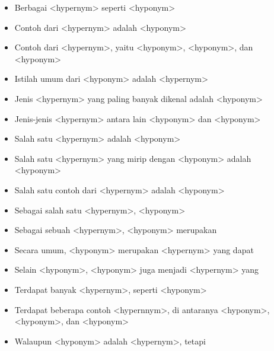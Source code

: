 \begin{itemize}
  \item Berbagai <hypernym> seperti <hyponym>
  \item Contoh dari <hypernym> adalah <hyponym>
  \item Contoh dari <hypernym>, yaitu <hyponym>, <hyponym>, dan <hyponym>
  \item Istilah umum dari <hyponym> adalah <hypernym>
  \item Jenis <hypernym> yang paling banyak dikenal adalah <hyponym>
  \item Jenis-jenis <hypernym> antara lain <hyponym> dan <hyponym>
  \item Salah satu <hypernym> adalah <hyponym>
  \item Salah satu <hypernym> yang mirip dengan <hyponym> adalah <hyponym>
  \item Salah satu contoh dari <hypernym> adalah <hyponym>
  \item Sebagai salah satu <hypernym>, <hyponym>
  \item Sebagai sebuah <hypernym>, <hyponym> merupakan
  \item Secara umum, <hyponym> merupakan <hypernym> yang dapat
  \item Selain <hyponym>, <hyponym> juga menjadi <hypernym> yang
  \item Terdapat banyak <hypernym>, seperti <hyponym>
  \item Terdapat beberapa contoh <hypernnym>, di antaranya <hyponym>, <hyponym>, dan <hyponym>
  \item Walaupun <hyponym> adalah <hypernym>, tetapi 
\end{itemize}


